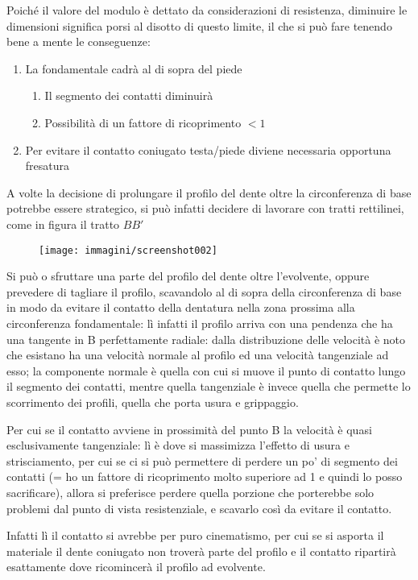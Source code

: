 \documentclass[a4paper, 15pt]{article}
\begin{document}
\begin{adjustwidth}{2in}{}
		Poiché il valore del modulo è dettato da considerazioni di resistenza, diminuire le dimensioni significa porsi al disotto di questo limite, il che si può fare tenendo bene a mente le conseguenze:
		\begin{enumerate}
			\item La fondamentale cadrà al di sopra del piede
			\begin{enumerate}
				\item Il segmento dei contatti diminuirà
				\item Possibilità di un fattore di ricoprimento $<1$
			\end{enumerate}
			\item Per evitare il contatto coniugato testa/piede diviene necessaria opportuna fresatura
		\end{enumerate}		
		A volte la decisione di prolungare il profilo del dente oltre la circonferenza di base potrebbe essere strategico, si può infatti decidere di lavorare con tratti rettilinei, come in figura il tratto $BB'$
		\begin{figure}[H]
			\centering
			\texttt{[image: immagini/screenshot002]}
			\label{fig:screenshot002}
		\end{figure}
		Si può o sfruttare una parte del profilo del dente oltre l'evolvente, oppure prevedere di tagliare il profilo, scavandolo al di sopra della circonferenza di base in modo da evitare il contatto della dentatura nella zona prossima alla circonferenza fondamentale: lì infatti il profilo arriva con una pendenza che ha una tangente in B perfettamente radiale: dalla distribuzione delle velocità è noto che esistano ha una velocità normale al profilo ed una velocità tangenziale ad esso; la componente normale è quella con cui si muove il punto di contatto lungo il segmento dei contatti, mentre quella tangenziale è invece quella che permette lo scorrimento dei profili, quella che porta usura e grippaggio. 
		
		Per cui se il contatto avviene in prossimità del punto B la velocità è quasi esclusivamente tangenziale: lì è dove si massimizza l'effetto di usura e strisciamento, per cui se ci si può permettere di perdere un po' di segmento dei contatti (= ho un fattore di ricoprimento molto superiore ad 1 e quindi lo posso sacrificare), allora si preferisce perdere quella porzione che porterebbe solo problemi dal punto di vista resistenziale, e scavarlo così da evitare il contatto. 
		
		Infatti lì il contatto si avrebbe per puro cinematismo, per cui se si asporta il materiale il dente coniugato non troverà parte del profilo e il contatto ripartirà esattamente dove ricomincerà il profilo ad evolvente. 
\end{adjustwidth}
\newpage
\end{document}

